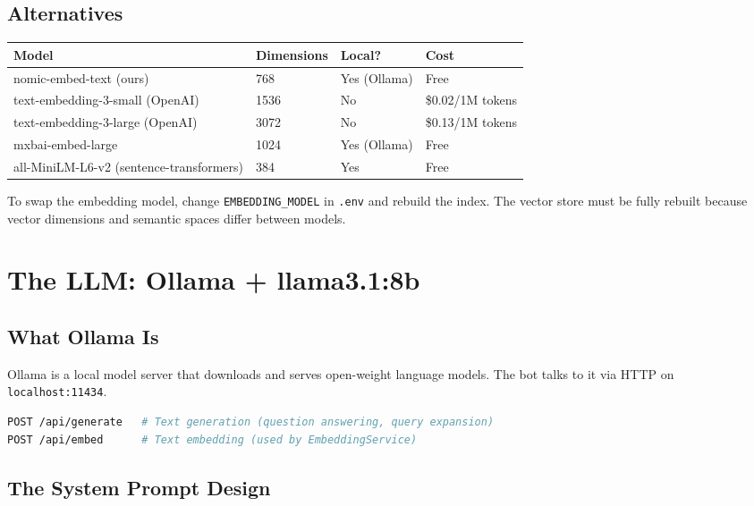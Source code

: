 \documentclass[12pt,letterpaper]{article}
\begin{document}
\subsection{Alternatives}

\begin{center}
\begin{tabular}{llll}
\toprule
\textbf{Model} & \textbf{Dimensions} & \textbf{Local?} & \textbf{Cost} \\
\midrule
nomic-embed-text (ours) & 768 & Yes (Ollama) & Free \\
text-embedding-3-small (OpenAI) & 1536 & No & \$0.02/1M tokens \\
text-embedding-3-large (OpenAI) & 3072 & No & \$0.13/1M tokens \\
mxbai-embed-large & 1024 & Yes (Ollama) & Free \\
all-MiniLM-L6-v2 (sentence-transformers) & 384 & Yes & Free \\
\bottomrule
\end{tabular}
\end{center}

To swap the embedding model, change \texttt{EMBEDDING\_MODEL} in \texttt{.env}
and rebuild the index. The vector store must be fully rebuilt because vector
dimensions and semantic spaces differ between models.

\section{The LLM: Ollama + llama3.1:8b}

\subsection{What Ollama Is}

Ollama is a local model server that downloads and serves open-weight language
models. The bot talks to it via HTTP on \texttt{localhost:11434}.

\begin{lstlisting}[language=bash, caption={Ollama endpoints used}]
POST /api/generate   # Text generation (question answering, query expansion)
POST /api/embed      # Text embedding (used by EmbeddingService)
\end{lstlisting}

\subsection{The System Prompt Design}
\end{document}
